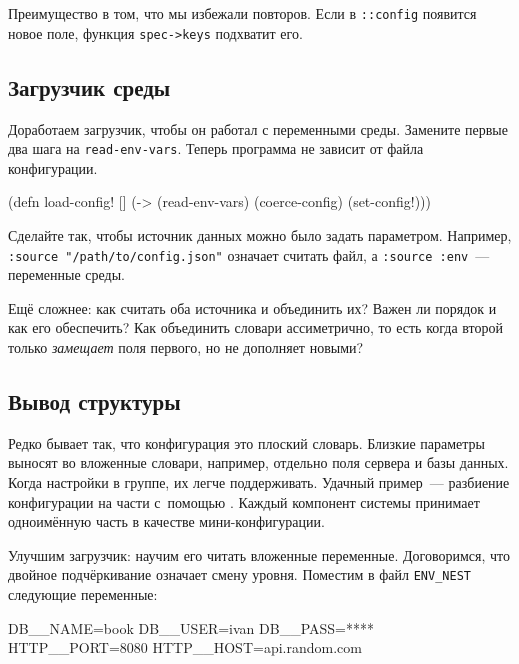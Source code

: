 \noindent
Преимущество в том, что мы избежали повторов. Если в \verb|::config| появится
новое поле, функция \verb|spec->keys| подхватит его.

\subsection{Загрузчик среды}

Доработаем загрузчик, чтобы он работал с переменными среды. Замените первые два
шага на \verb|read-env-vars|. Теперь программа не зависит от файла
конфигурации.

\begin{english}
  \begin{clojure}
(defn load-config! []
  (-> (read-env-vars)
      (coerce-config)
      (set-config!)))
  \end{clojure}
\end{english}

Сделайте так, чтобы источник данных можно было задать параметром. Например,
\verb|:source "/path/to/config.json"| означает считать файл, а
\verb|:source :env|~--- переменные среды.


Ещё сложнее: как считать оба источника и объединить их? Важен ли порядок и
как его обеспечить? Как объединить словари ассиметрично, то есть когда второй
только \emph{замещает} поля первого, но не дополняет новыми?

\subsection{Вывод структуры}


Редко бывает так, что конфигурация это плоский словарь. Близкие параметры
выносят во вложенные словари, например, отдельно поля сервера и базы
данных. Когда настройки в группе, их легче поддерживать. Удачный пример~---
разбиение конфигурации на части с~помощью .
Каждый компонент системы принимает одноимённую часть в качестве мини-конфигурации.

Улучшим загрузчик: научим его читать вложенные переменные. Договоримся, что
двойное подчёркивание означает смену уровня. Поместим в файл \verb|ENV_NEST|
следующие переменные:

\begin{english}
  \begin{bash}
DB__NAME=book
DB__USER=ivan
DB__PASS=****
HTTP__PORT=8080
HTTP__HOST=api.random.com
  \end{bash}
\end{english}


